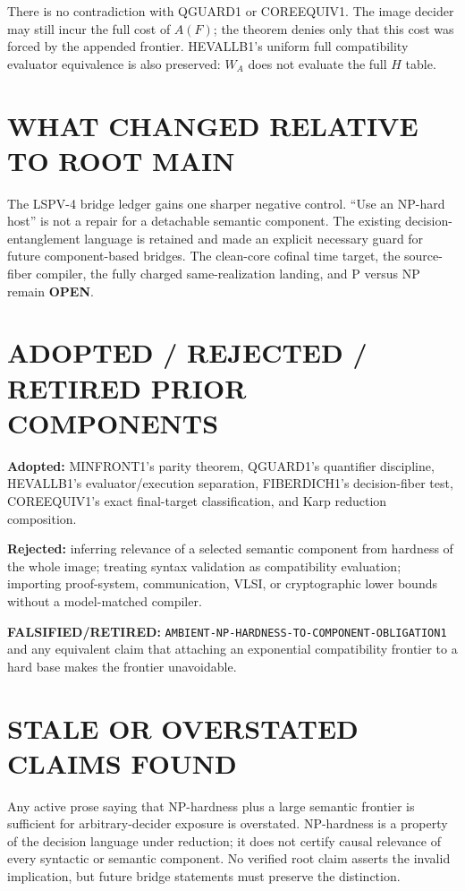 \documentclass[11pt]{article}
\newcommand{\OPEN}{\textbf{OPEN}}
\begin{document}
There is no contradiction with QGUARD1 or COREEQUIV1.  The image decider may
still incur the full cost of \(A(F)\); the theorem denies only that this cost
was forced by the appended frontier.  HEVALLB1's uniform full compatibility
evaluator equivalence is also preserved: \(W_A\) does not evaluate the full
\(H\) table.

\section{WHAT CHANGED RELATIVE TO ROOT MAIN}

The LSPV-4 bridge ledger gains one sharper negative control.  ``Use an NP-hard
host'' is not a repair for a detachable semantic component.  The existing
decision-entanglement language is retained and made an explicit necessary
guard for future component-based bridges.  The clean-core cofinal time target,
the source-fiber compiler, the fully charged same-realization landing, and
P versus NP remain \OPEN.

\section{ADOPTED / REJECTED / RETIRED PRIOR COMPONENTS}

\textbf{Adopted:} MINFRONT1's parity theorem, QGUARD1's quantifier discipline,
HEVALLB1's evaluator/execution separation, FIBERDICH1's decision-fiber test,
COREEQUIV1's exact final-target classification, and Karp reduction composition.

\textbf{Rejected:} inferring relevance of a selected semantic component from
hardness of the whole image; treating syntax validation as compatibility
evaluation; importing proof-system, communication, VLSI, or cryptographic
lower bounds without a model-matched compiler.

\textbf{FALSIFIED/RETIRED:}
\texttt{AMBIENT-NP-HARDNESS-TO-COMPONENT-OBLIGATION1} and any equivalent
claim that attaching an exponential compatibility frontier to a hard base
makes the frontier unavoidable.

\section{STALE OR OVERSTATED CLAIMS FOUND}

Any active prose saying that NP-hardness plus a large semantic frontier is
sufficient for arbitrary-decider exposure is overstated.  NP-hardness is a
property of the decision language under reduction; it does not certify causal
relevance of every syntactic or semantic component.  No verified root claim
asserts the invalid implication, but future bridge statements must preserve
the distinction.
\end{document}
